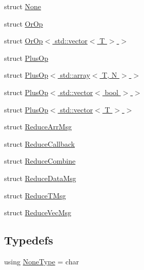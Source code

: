 \begin{DoxyCompactItemize}
\item 
struct \hyperlink{structvt_1_1collective_1_1reduce_1_1operators_1_1_none}{None}
\item 
struct \hyperlink{structvt_1_1collective_1_1reduce_1_1operators_1_1_or_op}{Or\+Op}
\item 
struct \hyperlink{structvt_1_1collective_1_1reduce_1_1operators_1_1_or_op_3_01std_1_1vector_3_01_t_01_4_01_4}{Or\+Op$<$ std\+::vector$<$ T $>$ $>$}
\item 
struct \hyperlink{structvt_1_1collective_1_1reduce_1_1operators_1_1_plus_op}{Plus\+Op}
\item 
struct \hyperlink{structvt_1_1collective_1_1reduce_1_1operators_1_1_plus_op_3_01std_1_1array_3_01_t_00_01_n_01_4_01_4}{Plus\+Op$<$ std\+::array$<$ T, N $>$ $>$}
\item 
struct \hyperlink{structvt_1_1collective_1_1reduce_1_1operators_1_1_plus_op_3_01std_1_1vector_3_01bool_01_4_01_4}{Plus\+Op$<$ std\+::vector$<$ bool $>$ $>$}
\item 
struct \hyperlink{structvt_1_1collective_1_1reduce_1_1operators_1_1_plus_op_3_01std_1_1vector_3_01_t_01_4_01_4}{Plus\+Op$<$ std\+::vector$<$ T $>$ $>$}
\item 
struct \hyperlink{structvt_1_1collective_1_1reduce_1_1operators_1_1_reduce_arr_msg}{Reduce\+Arr\+Msg}
\item 
struct \hyperlink{structvt_1_1collective_1_1reduce_1_1operators_1_1_reduce_callback}{Reduce\+Callback}
\item 
struct \hyperlink{structvt_1_1collective_1_1reduce_1_1operators_1_1_reduce_combine}{Reduce\+Combine}
\item 
struct \hyperlink{structvt_1_1collective_1_1reduce_1_1operators_1_1_reduce_data_msg}{Reduce\+Data\+Msg}
\item 
struct \hyperlink{structvt_1_1collective_1_1reduce_1_1operators_1_1_reduce_t_msg}{Reduce\+T\+Msg}
\item 
struct \hyperlink{structvt_1_1collective_1_1reduce_1_1operators_1_1_reduce_vec_msg}{Reduce\+Vec\+Msg}
\end{DoxyCompactItemize}
\subsection*{Typedefs}
\begin{DoxyCompactItemize}
\item 
using \hyperlink{namespacevt_1_1collective_1_1reduce_1_1operators_a1e8a587884de5e874a701ee300ca247c}{None\+Type} = char
\end{DoxyCompactItemize}


